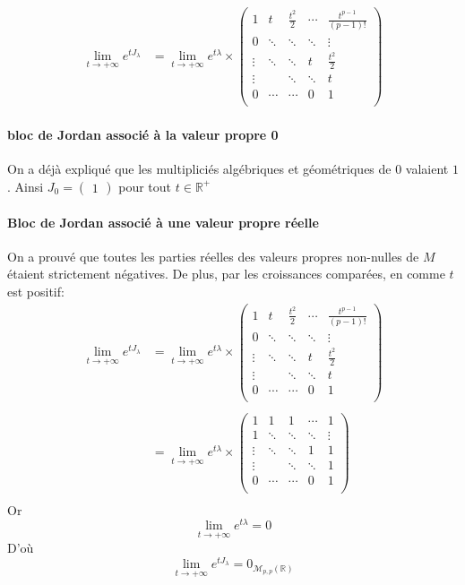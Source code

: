 \documentclass[a4paper]{article}
\theoremstyle{plain}
\theoremstyle{definition}
\theoremstyle{remark}
\begin{document}
\begin{align*}
    \lim\limits_{t \rightarrow +\infty}e^{tJ_{\lambda}}&=\lim\limits_{t \rightarrow +\infty}e^{t\lambda}\times \begin{pmatrix}
1 & t& \frac{t^2}{2} & \cdots & \frac{t^{p-1}}{(p-1)!} \\
0 & \ddots&\ddots & \ddots & \vdots \\
\vdots & \ddots & \ddots &t& \frac{t^2}{2} \\
\vdots & &\ddots & \ddots & t \\
0 & \cdots&\cdots & 0 & 1 \\ \end{pmatrix}
\end{align*}

\paragraph{bloc de Jordan associé à la valeur propre 0}
On a déjà expliqué que les multipliciés algébriques et géométriques de $0$ valaient $1$. Ainsi $J_0=\begin{pmatrix}
1
\end{pmatrix}$ pour tout $t\in\mathbb{R}^+$
\paragraph{Bloc de Jordan associé à une valeur propre réelle}
On a prouvé que toutes les parties réelles des valeurs propres non-nulles de $M$ étaient strictement négatives. De plus, par les croissances comparées, en comme $t$ est positif:
\begin{align*}
    \lim\limits_{t \rightarrow +\infty}e^{tJ_{\lambda}}&=\lim\limits_{t \rightarrow +\infty}e^{t\lambda}\times \begin{pmatrix}
1 & t& \frac{t^2}{2} & \cdots & \frac{t^{p-1}}{(p-1)!} \\
0 & \ddots&\ddots & \ddots & \vdots \\
\vdots & \ddots & \ddots &t& \frac{t^2}{2} \\
\vdots & &\ddots & \ddots & t \\
0 & \cdots&\cdots & 0 & 1 \\ \end{pmatrix}\\
\\
&= \lim\limits_{t \rightarrow +\infty}e^{t\lambda}\times \begin{pmatrix}
1 & 1& 1 & \cdots & 1\\
1 & \ddots&\ddots & \ddots & \vdots \\
\vdots & \ddots & \ddots &1& 1 \\
\vdots & &\ddots & \ddots & 1 \\
0 & \cdots&\cdots & 0 & 1 \\ \end{pmatrix}\\
\end{align*}
Or $$\lim\limits_{t \rightarrow +\infty}e^{t\lambda}=0$$
D'où
$$\lim\limits_{t \rightarrow +\infty}e^{tJ_{\lambda}}=0_{\mathcal{M}_{p,p}(\mathbb{R})}$$
\end{document}
